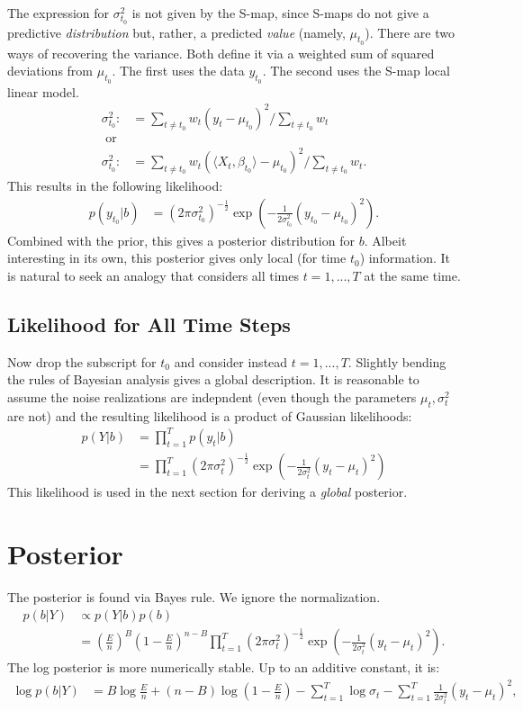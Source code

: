 \documentclass{article}
\theoremstyle{definition}
\begin{document}
The expression for $\sigma^2_{t_0}$ is not given by the S-map, since
S-maps do not give a predictive \emph{distribution} but, rather, a
predicted \emph{value} (namely, $\mu_{t_0}$). There are two ways of
recovering the variance. Both define it via a weighted sum of squared
deviations from $\mu_{t_0}$. The first uses the data $y_{t_0}$. The second
uses the S-map local linear model.
\begin{align*}
  \sigma^2_{t_0} :&= \sum_{t \neq t_0} w_t ( y_t - \mu_{t_0})^2 / \sum_{t \neq t_0} w_t \\
  \text{ or }\\
  \sigma^2_{t_0} :&= \sum_{t \neq t_0} w_t ( \langle X_t, \beta_{t_0} \rangle - \mu_{t_0})^2 / \sum_{t \neq t_0} w_t.
\end{align*}
%
This results in the following likelihood:
\begin{align*}
  p( y_{t_0} | b ) &= (2\pi \sigma^2_{t_0})^{-\frac12} \exp \left (
  -\frac{1}{2\sigma^2_{t_0}} (y_{t_0} - \mu_{t_0} )^2 \right ).
\end{align*}
Combined with the prior, this gives a posterior distribution for
$b$. Albeit interesting in its own, this posterior gives only local
(for time $t_0$) information. It is natural to seek an analogy
that considers all times $t=1,...,T$ at the same time. 
%
%
\subsection{Likelihood for All Time Steps}
Now drop the subscript for $t_0$ and consider instead $t=1,...,T$.
Slightly bending the rules of Bayesian analysis gives a global
description. It is reasonable to assume the noise realizations are
indepndent (even though the parameters $\mu_t,\sigma^2_t$ are not) and
the resulting likelihood is a product of Gaussian likelihoods:
\begin{align*}
  p( Y | b ) &= \prod_{t=1}^T p(y_t | b ) \\
  &= \prod_{t=1}^T (2\pi \sigma^2_t)^{-\frac12} \exp \left ( -\frac{1}{2\sigma^2_t} (y_t - \mu_t )^2 \right )
\end{align*}
This likelihood is used in the next section for deriving a \emph{global} posterior.

\section{Posterior}
The posterior is found via Bayes rule. We ignore the normalization.
%
\begin{align*}
  p( b | Y ) & \propto p( Y | b ) p(b) \\
  &= \left ( \frac{E}{n} \right )^{B} \left ( 1 - \frac{E}{n} \right )^{n-B}
  \prod_{t=1}^T (2\pi \sigma^2_t)^{-\frac12} \exp \left ( -\frac{1}{2\sigma^2_t} (y_t - \mu_t )^2 \right ).
\end{align*}
%
The log posterior is more numerically stable. Up to an additive constant, it is:
%
\begin{align*}
  \log p( b | Y ) &= B \log \frac{E}{n} + (n-B) \log \left ( 1 - \frac{E}{n} \right )
  -\sum_{t=1}^T \log \sigma_t  - \sum_{t=1}^T \frac{1}{2\sigma^2_t}  (y_t - \mu_t)^2,
\end{align*}
\end{document}
